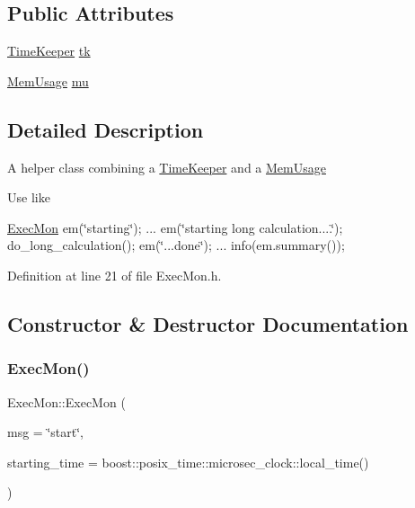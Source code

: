 \subsection*{Public Attributes}
\begin{DoxyCompactItemize}
\item 
\hyperlink{class_wire_cell_1_1_time_keeper}{Time\+Keeper} \hyperlink{class_wire_cell_1_1_exec_mon_abdbaf65a4ec1def3a226c7b94851ed3d}{tk}
\item 
\hyperlink{class_wire_cell_1_1_mem_usage}{Mem\+Usage} \hyperlink{class_wire_cell_1_1_exec_mon_a7401839fabb43101f59468d9a1b43864}{mu}
\end{DoxyCompactItemize}


\subsection{Detailed Description}
A helper class combining a \hyperlink{class_wire_cell_1_1_time_keeper}{Time\+Keeper} and a \hyperlink{class_wire_cell_1_1_mem_usage}{Mem\+Usage}

Use like

\hyperlink{class_wire_cell_1_1_exec_mon}{Exec\+Mon} em(\char`\"{}starting\char`\"{}); ... em(\char`\"{}starting long calculation....\char`\"{}); do\+\_\+long\+\_\+calculation(); em(\char`\"{}...\+done\char`\"{}); ... info(em.\+summary()); 

Definition at line 21 of file Exec\+Mon.\+h.



\subsection{Constructor \& Destructor Documentation}
\mbox{\label{class_wire_cell_1_1_exec_mon_a1a08950f85d1874aa41ac1231d6e30ca}} 
\subsubsection{\texorpdfstring{Exec\+Mon()}{ExecMon()}}
{\footnotesize\ttfamily Exec\+Mon\+::\+Exec\+Mon (\begin{DoxyParamCaption}\item[{const std\+::string \&}]{msg = {\ttfamily \char`\"{}start\char`\"{}},  }\item[{\hyperlink{class_wire_cell_1_1_time_keeper_a3600404e97a1581a1c2630f92f490603}{Time\+Keeper\+::ptime}}]{starting\+\_\+time = {\ttfamily boost\+:\+:posix\+\_\+time\+:\+:microsec\+\_\+clock\+:\+:local\+\_\+time()} }\end{DoxyParamCaption})}



